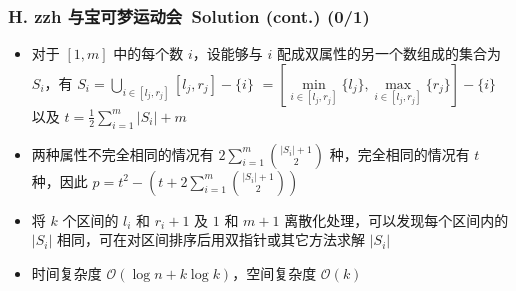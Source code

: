 \documentclass[notheorems]{beamer}
\newcommand{\zhProbH}{zzh 与宝可梦运动会}	\newcommand{\DiffH}{Hard}		\newcommand{\AuthProbH}{\texttt{zzh}}			\newcommand{\TestProbH}{\texttt{skywalkert}}
\newcommand{\AccInProbH}{0}	\newcommand{\SubInProbH}{1}	\newcommand{\RatInProbH}{00.00\%}
\begin{document}
\begin{frame}
\frametitle{\\ H. \zhProbH\ Solution (cont.) (\AccInProbH/\SubInProbH)}
\begin{spacing}{1.5} \large
\begin{itemize}
\item 对于 $[1, m]$ 中的每个数 $i$，设能够与 $i$ 配成双属性的另一个数组成的集合为 $S_{i}$，有 $S_i = \bigcup\limits_{i \in [l_j, r_j]}{[l_j, r_j]} - \{i\}$ $= \left[\min\limits_{i \in [l_j, r_j]} \{l_j\}, \max\limits_{i \in [l_j, r_j]}\{r_j\}\right] - \{i\}$ 以及 $t = \frac{1}{2}\sum\limits_{i = 1}^{m}{|S_i|} + m$ \pause
\item 两种属性不完全相同的情况有 $2 \sum_{i = 1}^{m}{|S_i| + 1 \choose 2}$ 种，完全相同的情况有 $t$ 种，因此 $p = t^2 - \left(t + 2 \sum_{i = 1}^{m}{|S_i| + 1 \choose 2}\right)$ \pause
\item 将 $k$ 个区间的 $l_i$ 和 $r_i + 1$ 及 $1$ 和 $m + 1$ 离散化处理，可以发现每个区间内的 $|S_i|$ 相同，可在对区间排序后用双指针或其它方法求解 $|S_i|$
\item 时间复杂度 $\mathcal{O}(\log n + k \log k)$，空间复杂度 $\mathcal{O}(k)$
\end{itemize}
\end{spacing}
\end{frame}
\end{document}
